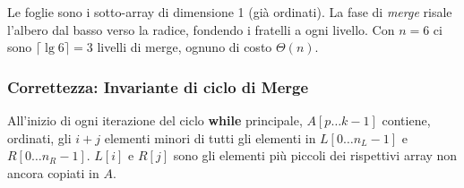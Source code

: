 \begin{esempio}[{MergeSort su $A=[5,2,4,6,1,3]$}]
	\begin{center}
	\end{center}
	Le foglie sono i sotto-array di dimensione 1 (già ordinati).
	La fase di \emph{merge} risale l'albero dal basso verso la radice,
	fondendo i fratelli a ogni livello. Con $n=6$ ci sono $\lceil\lg 6\rceil
	= 3$ livelli di merge, ognuno di costo $\Theta(n)$.
\end{esempio}


\subsubsection{Correttezza: Invariante di ciclo di Merge}

\begin{definizione}
	All'inizio di ogni iterazione del ciclo \textbf{while} principale,
	$A[p \ldots k-1]$ contiene, ordinati, gli $i+j$ elementi minori
	di tutti gli elementi in $L[0 \ldots n_L-1]$ e $R[0 \ldots n_R-1]$.
	$L[i]$ e $R[j]$ sono gli elementi più piccoli dei rispettivi array
	non ancora copiati in $A$.
\end{definizione}

